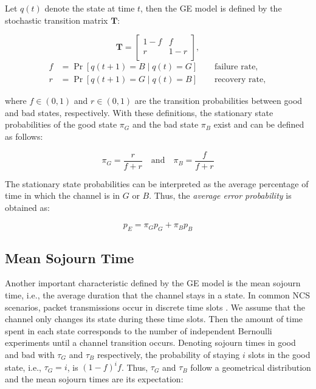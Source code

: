 Let $q(t)$ denote the state at time $t$, then the GE model is defined by the
stochastic transition matrix $\boldsymbol{T}$:

\begin{equation}
  \label{eq:GE_transition}
  \boldsymbol{T} = 
  \begin{bmatrix}
    1-f & f \\
    r & 1-r \\
  \end{bmatrix},
\end{equation}
\begin{align}
  f &= \Pr[q(t+1) = B \mid q(t) = G] \qquad \textrm{failure rate}, \\
  r &= \Pr[q(t+1) = G \mid q(t) = B] \qquad \textrm{recovery rate},
\end{align}

where $f\in(0,1)$ and $r\in(0,1)$ are the transition probabilities between good
and bad states, respectively. With these definitions, the stationary state
probabilities of the good state $\pi_G$ and the bad state $\pi_B$ exist and can
be defined as follows:

\begin{equation}
  \pi_G = \frac{r}{f+r} \quad \textrm{and} \quad \pi_B = \frac{f}{f+r}
\end{equation}

The stationary state probabilities can be interpreted as the average percentage
of time in which the channel is in $G$ or $B$. Thus, the \textit{average error
probability} is obtained as:

\begin{equation}
  p_E = \pi_G p_G + \pi_B p_B
  \label{eq:avgLoss}
\end{equation}

\subsection{Mean Sojourn Time}
Another important characteristic defined by the GE model is the mean sojourn
time, i.e., the average duration that the channel stays in a state. In common
NCS scenarios, packet transmissions occur in discrete time slots
\cite{park2017wireless}. We assume that the channel only changes its state
during these time slots. Then the amount of time spent in each state corresponds
to the number of independent Bernoulli experiments until a channel transition
occurs. Denoting sojourn times in good and bad with $\tau_G$ and $\tau_B$
respectively, the probability of staying $i$ slots in the good state, i.e.,
$\tau_G=i$, is $(1-f)^if$. Thus, $\tau_G$ and $\tau_B$ follow a geometrical
distribution and the mean sojourn times are its expectation: 


